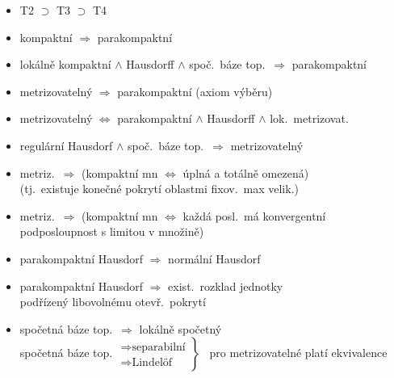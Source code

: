\begin{veta}
\begin{itemize}[nosep]
  \item T2 $\supset$ T3 $\supset$ T4
  \item kompaktní $\Rightarrow$ parakompaktní
  \item lokálně kompaktní $\wedge$ Hausdorff $\wedge$ spoč.\ báze top.\ $\Rightarrow$ parakompaktní
  \item metrizovatelný $\Rightarrow$ parakompaktní \quad (axiom výběru)
  \item metrizovatelný $\Leftrightarrow$ parakompaktní $\wedge$ Hausdorff $\wedge$ lok.\ metrizovat.
  \item regulární Hausdorf $\wedge$ spoč.\ báze top.\ $\Rightarrow$ metrizovatelný
  \item metriz.\ $\Rightarrow$ (kompaktní mn $\Leftrightarrow$ úplná a totálně omezená) \\
        \quad (tj.\ existuje konečné pokrytí oblastmi fixov.\ max velik.)
  \item metriz.\ $\Rightarrow$ (kompaktní mn $\Leftrightarrow$ každá posl.\ má konvergentní \\
        \quad podposloupnost s limitou v množině)
  \item parakompaktní Hausdorf $\Rightarrow$ normální Hausdorf
  \item parakompaktní Hausdorf $\Rightarrow$ exist.\ rozklad jednotky \\
        \quad podřízený libovolnému otevř.\ pokrytí
  \item spočetná báze top.\ $\Rightarrow$ lokálně spočetný \\
        spočetná báze top.
        $\left.\begin{array}{l}
          \Rightarrow \text{separabilní} \\
          \Rightarrow \text{Lindelöf}
        \end{array}\right\}$ \ pro metrizovatelné platí ekvivalence
\end{itemize}
\end{veta}

